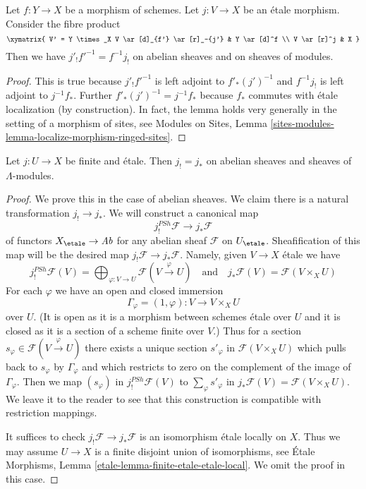 \begin{lemma}
\label{lemma-shriek-base-change}
Let $f: Y \to X$ be a morphism of schemes. Let $j: V \to X$ be an \'etale
morphism. Consider the fibre product
$$
\xymatrix{
V' = Y \times_X V \ar[d]_{f'} \ar[r]_-{j'} & Y \ar[d]^f \\
V \ar[r]^j & X
}
$$
Then we have $j'_! f'^{-1} = f^{-1} j_!$ on abelian sheaves and on
sheaves of modules.
\end{lemma}

\begin{proof}
This is true because $j'_! f'^{-1}$ is left adjoint to
$f'_* (j')^{-1}$ and $f^{-1} j_!$ is left adjoint to $j^{-1}f_*$.
Further $f'_* (j')^{-1} = j^{-1}f_*$ because $f_*$ commutes with
\'etale localization (by construction). In fact, the lemma holds very generally
in the setting of a morphism of sites, see
Modules on Sites, Lemma
\ref{sites-modules-lemma-localize-morphism-ringed-sites}.
\end{proof}

\begin{lemma}
\label{lemma-shriek-equals-star-finite-etale}
Let $j : U \to X$ be finite and \'etale. Then $j_! = j_*$
on abelian sheaves and sheaves of $\Lambda$-modules.
\end{lemma}

\begin{proof}
We prove this in the case of abelian sheaves. We claim there
is a natural transformation $j_! \to j_*$. We will construct
a canonical map
$$
j_!^{PSh}\mathcal{F} \to j_*\mathcal{F}
$$
of functors $X_\etale \to \textit{Ab}$ for any abelian sheaf
$\mathcal{F}$ on $U_\etale$. Sheafification of this map will
be the desired map $j_!\mathcal{F} \to j_*\mathcal{F}$. Namely,
given $V \to X$ \'etale we have
$$
j_!^{PSh}\mathcal{F}(V) =
\bigoplus\nolimits_{\varphi : V \to U} \mathcal{F}(V \xrightarrow{\varphi} U)
\quad\text{and}\quad
j_*\mathcal{F}(V) = \mathcal{F}(V \times_X U)
$$
For each $\varphi$ we have an open and closed immersion
$$
\Gamma_\varphi = (1, \varphi) : V \longrightarrow V \times_X U
$$
over $U$. (It is open as it is a morphism between schemes \'etale
over $U$ and it is closed as it is a section of a scheme finite
over $V$.) Thus for a section
$s_\varphi \in \mathcal{F}(V \xrightarrow{\varphi} U)$
there exists a unique section $s'_\varphi$ in $\mathcal{F}(V \times_X U)$
which pulls back to $s_\varphi$ by $\Gamma_\varphi$
and which restricts to zero on the complement of the image of $\Gamma_\varphi$.
Then we map $(s_\varphi)$ in $j_!^{PSh}\mathcal{F}(V)$
to $\sum_\varphi s'_\varphi$ in
$j_*\mathcal{F}(V) = \mathcal{F}(V \times_X U)$.
We leave it to the reader to see that this construction is
compatible with restriction mappings.

\medskip\noindent
It suffices to check $j_!\mathcal{F} \to j_*\mathcal{F}$
is an isomorphism \'etale locally on $X$.
Thus we may assume $U \to X$ is a finite disjoint union
of isomorphisms, see
\'Etale Morphisms, Lemma \ref{etale-lemma-finite-etale-etale-local}.
We omit the proof in this case.
\end{proof}

